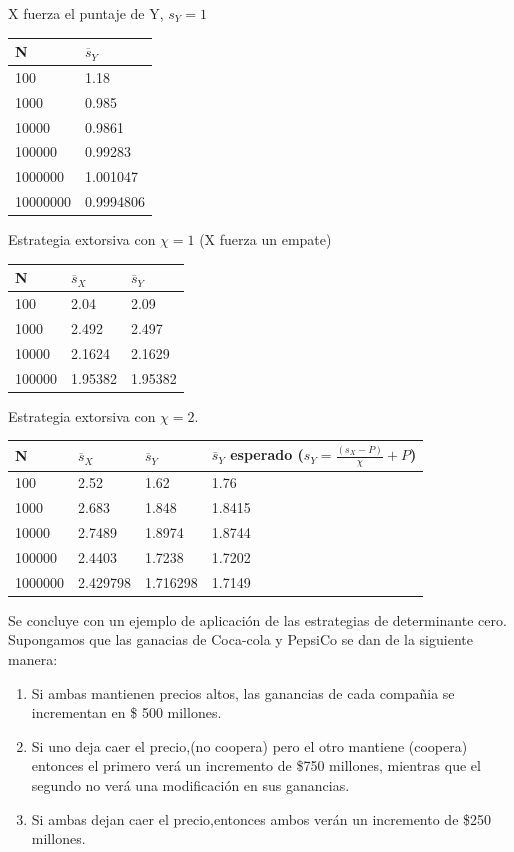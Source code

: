\documentclass[12pt]{article}
\begin{document}
X fuerza el puntaje de Y, $s_Y=1$
\begin{center}
  \begin{tabular}{| l | l |}
    \hline
    N & $\overline s_Y$ \\\hline
    100 & 1.18 \\\hline
    1000 & 0.985 \\\hline
    10000 & 0.9861 \\\hline
    100000 & 0.99283 \\\hline
    1000000 & 1.001047 \\\hline
    10000000 & 0.9994806 \\\hline
    
  \end{tabular}
\end{center}
Estrategia extorsiva con $\chi=1$ (X fuerza un empate)
\begin{center}
  \begin{tabular}{| l | l | l |}    
    \hline
    N & $\overline s_X$ & $\overline s_Y$ \\\hline
    100 & 2.04 & 2.09 \\\hline
    1000 & 2.492 & 2.497 \\\hline
    10000 & 2.1624 & 2.1629 \\\hline
    100000 & 1.95382 & 1.95382 \\\hline
  \end{tabular}
\end{center}
Estrategia extorsiva con $\chi=2$. 
\begin{center}
  \begin{tabular}{| l | l | l | l |}
    \hline
    N & $\overline s_X$ & $\overline
    s_Y$ & $\overline s_Y$ esperado ($s_Y=\frac{(s_X-P)}{\chi} + P$)\\\hline
    100 & 2.52 & 1.62 & 1.76\\\hline
    1000 & 2.683 & 1.848 & 1.8415  \\\hline
    10000 & 2.7489 & 1.8974 & 1.8744\\\hline
    100000 & 2.4403 & 1.7238 & 1.7202 \\\hline
    1000000 & 2.429798 & 1.716298 & 1.7149 \\\hline
  \end{tabular}
\end{center}

Se concluye con un ejemplo de aplicación de las estrategias de determinante cero.
Supongamos que las ganacias de Coca-cola y PepsiCo se dan de la siguiente manera:
\begin{enumerate}
 \item Si ambas mantienen precios altos, las ganancias de cada compañia se incrementan
 en \$ 500 millones. 
 \item Si uno deja caer el precio,(no coopera) pero el otro mantiene (coopera) entonces 
 el primero verá un incremento de \$750 millones, mientras que el segundo no verá una modificación en sus ganancias.
 \item Si ambas dejan caer el precio,entonces ambos verán un incremento de \$250 millones.
\end{enumerate}
 
\end{document}
